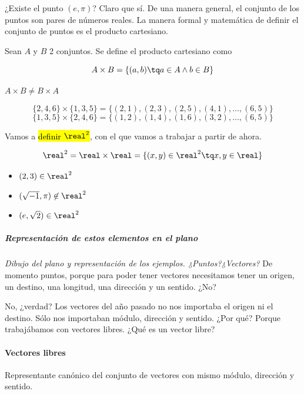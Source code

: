 \documentclass[palatino,nosec]{Docencia}
\begin{document}
¿Existe el punto $(e,π)$? Claro que sí. De una manera general, el conjunto de los puntos son pares de números reales. La manera formal y matemática de definir el conjunto de puntos es el producto cartesiano.

\begin{defn}
Sean $A$ y $B$ 2 conjuntos. Se define el producto cartesiano como

\[
	A\times B = \left\{ (a,b) \tq a\in A \wedge b\in B \right\}
\]
\end{defn}

\obs $A\times B \neq B\times A$

\begin{example}
\[\{2,4,6\}\times \{1,3,5\} = \{(2,1),(2,3),(2,5),(4,1),...,(6,5)\}\]
\[\{1,3,5\}\times \{2,4,6\} = \{(1,2),(1,4),(1,6),(3,2),...,(6,5)\}\]
\end{example}

Vamos a \hl{definir $\real^2$}, con el que vamos a trabajar a partir de ahora. 

\[\real^2 = \real\times\real = \{ (x,y)\in\real^2 \tq x,y\in\real\}\]

\begin{example}
	\begin{itemize}
		\item $(2,3)\in\real^2$
		\item $(\sqrt{-1},\pi)\not\in\real^2$
		\item $(e,\sqrt{2})\in\real^2$
	\end{itemize}
\end{example}


\subparagraph{Representación de estos elementos en el plano}

\textit{Dibujo del plano y representación de los ejemplos. ¿Puntos?¿Vectores?}
De momento puntos, porque para poder tener vectores necesitamos tener un origen, un destino, una longitud, una dirección y un sentido. ¿No?

No, ¿verdad? Los vectores del año pasado no nos importaba el origen ni el destino. Sólo nos importaban módulo, dirección y sentido. ¿Por qué? Porque trabajábamos con vectores libres. ¿Qué es un vector libre?

\paragraph*{Vectores libres}

\begin{defn}
Representante canónico del conjunto de vectores con mismo módulo, dirección y sentido.
\end{defn}
\end{document}

